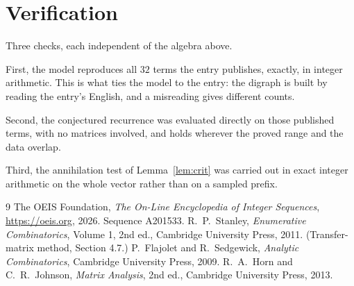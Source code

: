 \documentclass[11pt,a4paper]{article}
\theoremstyle{plain}
\theoremstyle{definition}
\begin{document}
\section{Verification}

Three checks, each independent of the algebra above.

First, the model reproduces all $32$ terms the entry publishes, exactly, in integer
arithmetic. This is what ties the model to the entry: the digraph is built by reading the
entry's English, and a misreading gives different counts.

Second, the conjectured recurrence was evaluated directly on those published terms, with no
matrices involved, and holds wherever the proved range and the data overlap.

Third, the annihilation test of Lemma~\ref{lem:crit} was carried out in exact integer
arithmetic on the whole vector rather than on a sampled prefix.

\begin{thebibliography}{9}
 The OEIS Foundation, \emph{The On-Line Encyclopedia of Integer
Sequences}, \url{https://oeis.org}, 2026. Sequence A201533.
 R.~P.~Stanley, \emph{Enumerative Combinatorics}, Volume 1, 2nd ed.,
Cambridge University Press, 2011. (Transfer-matrix method, Section 4.7.)
 P.~Flajolet and R.~Sedgewick, \emph{Analytic Combinatorics}, Cambridge
University Press, 2009.
 R.~A.~Horn and C.~R.~Johnson, \emph{Matrix Analysis}, 2nd ed., Cambridge
University Press, 2013.
\end{thebibliography}
\end{document}
